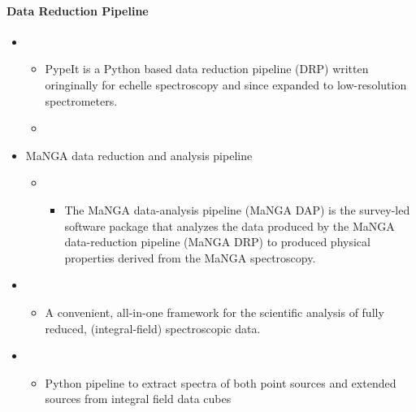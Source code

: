 \documentclass[letterpaper,10pt,english]{sphinxmanual}
\begin{document}
\paragraph{Data Reduction Pipeline}
\label{\detokenize{resource/astro/topics/spectroscopy:data-reduction-pipeline}}\begin{itemize}
\item {} 
\begin{itemize}
\item {} 
PypeIt is a Python based data reduction pipeline (DRP) written
oringinally for echelle spectroscopy and since expanded to
low-resolution spectrometers.

\item {} 

\end{itemize}

\item {} 
MaNGA data reduction and analysis pipeline
\begin{itemize}
\item {} 
\begin{itemize}
\item {} 
The MaNGA data-analysis pipeline (MaNGA DAP) is the survey-led
software package that analyzes the data produced by the MaNGA
data-reduction pipeline (MaNGA DRP) to produced physical
properties derived from the MaNGA spectroscopy.

\end{itemize}

\end{itemize}

\item {} 
\begin{itemize}
\item {} 
A convenient, all-in-one framework for the scientific analysis of
fully reduced, (integral-field) spectroscopic data.

\end{itemize}

\item {} 
\begin{itemize}
\item {} 
Python pipeline to extract spectra of both point sources and
extended sources from integral field data cubes


\end{itemize}
\end{itemize}
\end{document}

